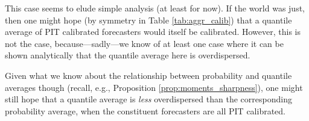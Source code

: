 \documentclass{article}
\begin{document}
This case seems to elude simple analysis (at least for now). If the world was
just, then one might hope (by symmetry in Table \ref{tab:aggr_calib}) that a
quantile average of PIT calibrated forecasters would itself be calibrated.
However, this is not the case, because---sadly---we know of at least one case
where it can be shown analytically that the quantile average here is
overdispersed.   

Given what we know about the relationship between probability and quantile
averages though (recall, e.g., Proposition \ref{prop:moments_sharpness}), one 
might still hope that a quantile average is \emph{less} overdispersed than the
corresponding probability average, when the constituent forecasters are all PIT 
calibrated. 



\end{document}
